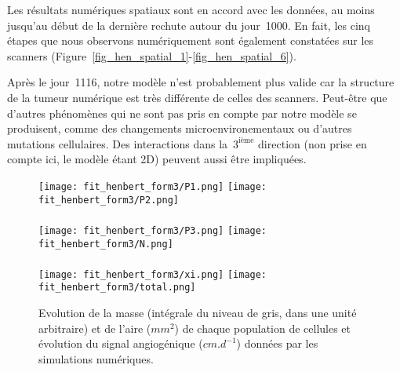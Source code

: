 \documentclass[main.tex]{subfiles}
\begin{document}
Les résultats numériques spatiaux sont en accord avec les données, au moins jusqu'au début de la dernière rechute autour du jour~1000. En fait, les cinq étapes que nous observons numériquement sont également constatées sur les scanners (\cf Figure~\ref{fig_hen_spatial_1}-\ref{fig_hen_spatial_6}).


Après le jour~1116, notre modèle n'est probablement plus valide car la structure de la tumeur numérique est très différente de celles des scanners. Peut-être que d'autres phénomènes qui ne sont pas pris en compte par notre modèle se produisent, comme des changements microenvironementaux ou d'autres mutations cellulaires. Des interactions dans la~$3^\textrm{ième}$ direction (non prise en compte ici, le modèle étant 2D) peuvent aussi être impliquées.


\begin{figure}[p]
\texttt{[image: fit\_henbert\_form3/P1.png]} \qquad
\texttt{[image: fit\_henbert\_form3/P2.png]} \\ \\
\texttt{[image: fit\_henbert\_form3/P3.png]} \qquad
\texttt{[image: fit\_henbert\_form3/N.png]} \\ \\
\texttt{[image: fit\_henbert\_form3/xi.png]} \qquad
\texttt{[image: fit\_henbert\_form3/total.png]}
\caption{Evolution de la masse (intégrale du niveau de gris, dans une unité arbitraire) et de l'aire ($mm^2$) de chaque population de cellules et évolution du signal angiogénique ($cm.d^{-1}$) données par les simulations numériques.} \label{fig:simu_henbert_mass_area}
\end{figure}
\end{document}
